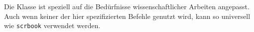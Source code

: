 \section{\HSKLbook}
Die Klasse \HSKLbook ist speziell auf die Bedürfnisse wissenschaftlicher
Arbeiten angepasst. Auch wenn keiner der hier spezifizierten Befehle genutzt
wird, kann \HSKLbook so universell wie \verb!scrbook! verwendet werden.






